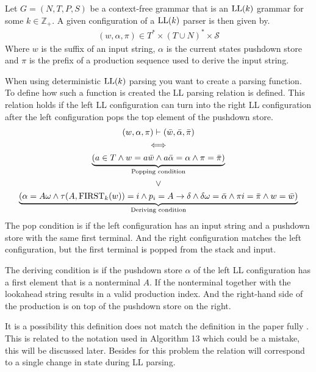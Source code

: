 \begin{definition}
    \label{def:ll-configuration}
    Let $G = (N, T, P, S)$ be a context-free grammar that is an $\text{LL}(k)$ grammar for some $k \in \mathbb{Z}_+$. A given configuration \cite[p. 5]{Vagner2007} of a $\text{LL}(k)$ parser is then given by.
    \begin{align*}
        (w, \alpha, \pi) \in T^* \times (T \cup N)^* \times \mathcal{S}
    \end{align*}
    Where $w$ is the suffix of an input string, $\alpha$ is the current states pushdown store and $\pi$ is the prefix of a production sequence used to derive the input string.
\end{definition}
\noindent When using deterministic $\text{LL}(k)$ parsing you want to create a parsing function. To define how such a function is created the LL parsing relation is defined. This relation holds if the left LL configuration can turn into the right LL configuration after the left configuration pops the top element of the pushdown store.
\begin{gather*}
    (w, \alpha, \pi) \vdash (\bar{w}, \bar{\alpha}, \bar{\pi}) \\
    \iff \\
    \underbrace{(a \in T \land w = a\bar{w} \land a\bar{\alpha} = \alpha \land \pi = \bar{\pi})}_{\text{Popping condition}} \\
    \lor \\
    \underbrace{\left(\alpha = A\omega \land \tau(A, \text{FIRST}_k(w)) = i \land p_i = A \to \delta \land \delta\omega = \bar{\alpha} \land \pi i = \bar{\pi} \land w = \bar{w}\right)}_{\text{Deriving condition}}
\end{gather*}
The pop condition is if the left configuration has an input string and a pushdown store with the same first terminal. And the right configuration matches the left configuration, but the first terminal is popped from the stack and input.

The deriving condition is if the pushdown store $\alpha$ of the left LL configuration has a first element that is a nonterminal $A$. If the nonterminal together with the lookahead string results in a valid production index. And the right-hand side of the production is on top of the pushdown store on the right.

It is a possibility this definition does not match the definition in the paper fully \cite[6]{Vagner2007}. This is related to the notation used in Algorithm 13 \cite[15]{Vagner2007} which could be a mistake, this will be discussed later. Besides for this problem the relation will correspond to a single change in state during LL parsing.

